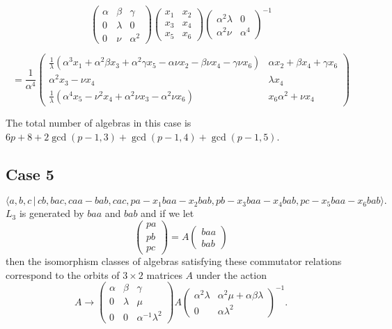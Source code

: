 \documentclass[10pt,thmsa]{article}
\begin{document}
\[
\left( 
\begin{array}{lll}
\alpha & \beta & \gamma \\ 
0 & \lambda & 0 \\ 
0 & \nu & \alpha ^{2}%
\end{array}%
\right) \left( 
\begin{array}{cc}
x_{1} & x_{2} \\ 
x_{3} & x_{4} \\ 
x_{5} & x_{6}%
\end{array}%
\right) \left( 
\begin{array}{ll}
\alpha ^{2}\lambda & 0 \\ 
\alpha ^{2}\nu & \alpha ^{4}%
\end{array}%
\right) ^{-1} 
\]%
$\allowbreak \allowbreak $

\[
=\frac{1}{\alpha ^{4}}\allowbreak \left( 
\begin{array}{cc}
\frac{1}{\lambda }\left( \alpha ^{3}x_{1}+\alpha ^{2}\beta x_{3}+\alpha
^{2}\gamma x_{5}-\alpha \nu x_{2}-\beta \nu x_{4}-\gamma \nu x_{6}\right) & 
\alpha x_{2}+\beta x_{4}+\gamma x_{6} \\ 
\alpha ^{2}x_{3}-\nu x_{4} & \lambda x_{4} \\ 
\frac{1}{\lambda }\left( \alpha ^{4}x_{5}-\nu ^{2}x_{4}+\alpha ^{2}\nu
x_{3}-\alpha ^{2}\nu x_{6}\right) & x_{6}\alpha ^{2}+\nu x_{4}%
\end{array}%
\right) 
\]%
$\allowbreak $

The total number of algebras in this case is $6p+8+2\gcd (p-1,3)+\gcd
(p-1,4)+\gcd (p-1,5)$.

\subsection{Case 5}

\[
\langle
a,b,c\,|%
\,cb,bac,caa-bab,cac,pa-x_{1}baa-x_{2}bab,pb-x_{3}baa-x_{4}bab,pc-x_{5}baa-x_{6}bab\rangle . 
\]%
$L_{3}$ is generated by $baa$ and $bab$ and if we let 
\[
\left( 
\begin{array}{l}
pa \\ 
pb \\ 
pc%
\end{array}%
\right) =A\left( 
\begin{array}{l}
baa \\ 
bab%
\end{array}%
\right) 
\]%
then the isomorphism classes of algebras satisfying these commutator
relations correspond to the orbits of $3\times 2$ matrices $A$ under the
action 
\[
A\rightarrow \left( 
\begin{array}{lll}
\alpha & \beta & \gamma \\ 
0 & \lambda & \mu \\ 
0 & 0 & \alpha ^{-1}\lambda ^{2}%
\end{array}%
\right) A\left( 
\begin{array}{ll}
\alpha ^{2}\lambda & \alpha ^{2}\mu +\alpha \beta \lambda \\ 
0 & \alpha \lambda ^{2}%
\end{array}%
\right) ^{-1}. 
\]
\end{document}
